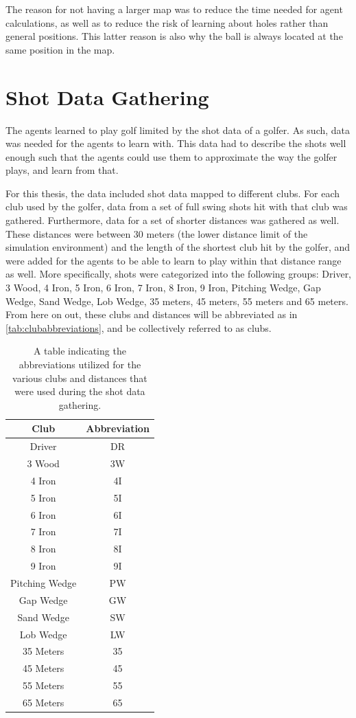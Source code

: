 \documentclass{kththesis}
\begin{document}
The reason for not having a larger map was to reduce the time needed for agent calculations, as well as to reduce the risk of learning about holes rather than general positions. This latter reason is also why the ball is always located at the same position in the map.

\section{Shot Data Gathering}
\label{sec:datagathering}
The agents learned to play golf limited by the shot data of a golfer. As such, data was needed for the agents to learn with. This data had to describe the shots well enough such that the agents could use them to approximate the way the golfer plays, and learn from that.

For this thesis, the data included shot data mapped to different clubs. For each club used by the golfer, data from a set of full swing shots hit with that club was gathered. Furthermore, data for a set of shorter distances was gathered as well. These distances were between 30 meters (the lower distance limit of the simulation environment) and the length of the shortest club hit by the golfer, and were added for the agents to be able to learn to play within that distance range as well. More specifically, shots were categorized into the following groups: Driver, 3 Wood, 4 Iron, 5 Iron, 6 Iron, 7 Iron, 8 Iron, 9 Iron, Pitching Wedge, Gap Wedge, Sand Wedge, Lob Wedge, 35 meters, 45 meters, 55 meters and 65 meters. From here on out, these clubs and distances will be abbreviated as in \autoref{tab:clubabbreviations}, and be collectively referred to as clubs.

\begin{table}
    \centering
    \begin{tabular}{c|c}
        \textbf{Club} & \textbf{Abbreviation} \\ \hline
        Driver & DR \\ 
        3 Wood & 3W \\  
        4 Iron & 4I \\  
        5 Iron & 5I \\  
        6 Iron & 6I \\  
        7 Iron & 7I \\  
        8 Iron & 8I \\  
        9 Iron & 9I \\  
        Pitching Wedge & PW \\  
        Gap Wedge & GW \\  
        Sand Wedge & SW \\  
        Lob Wedge & LW \\  
        35 Meters & 35 \\  
        45 Meters & 45 \\  
        55 Meters & 55 \\  
        65 Meters & 65 \\  
    \end{tabular}
    \caption{A table indicating the abbreviations utilized for the various clubs and distances that were used during the shot data gathering.}
    \label{tab:clubabbreviations}
\end{table}
\end{document}
